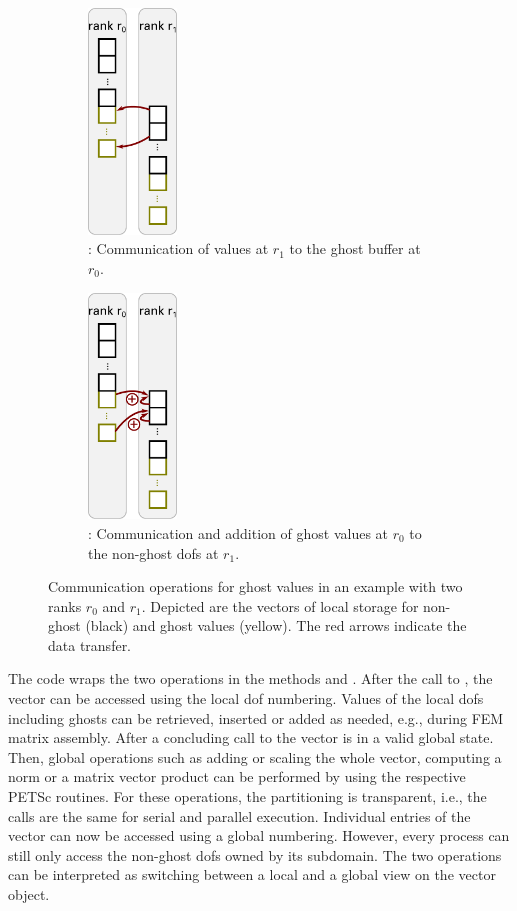 \begin{figure}%
  \centering%
  \begin{subfigure}[t]{0.45\textwidth}%
    \centering%
    \includegraphics[height=6cm]{images/implementation/1d_comm1.pdf}
    \caption{: Communication of values at $r_1$ to the ghost buffer at $r_0$.}%
    \label{fig:1d_comm1}%
  \end{subfigure}
  \quad
  \begin{subfigure}[t]{0.45\textwidth}%
    \centering%
    \includegraphics[height=6cm]{images/implementation/1d_comm2.pdf}
    \caption{: Communication and addition of ghost values at $r_0$ to the non-ghost dofs at $r_1$.}%
    \label{fig:1d_comm2}%
  \end{subfigure}
  \caption{Communication operations for ghost values in an example with two ranks $r_0$ and $r_1$. Depicted are the vectors of local storage for non-ghost (black) and ghost values (yellow). The red arrows indicate the data transfer.}%
  \label{fig:1d_comm}%
\end{figure}%
The \opendihu{} code wraps the two operations in the methods  and . After the call to , the vector can be accessed using the local dof numbering. Values of the local dofs including ghosts can be retrieved, inserted or added as needed, e.g., during FEM matrix assembly. 
After a concluding call to  the vector is in a valid global state. Then, global operations such as adding or scaling the whole vector, computing a norm or a matrix vector product can be performed by using the respective PETSc routines. For these operations, the partitioning is transparent, i.e., the calls are the same for serial and parallel execution. Individual entries of the vector can now be accessed using a global numbering. However, every process can still only access the non-ghost dofs owned by its subdomain. The two operations can be interpreted as switching between a local and a global view on the vector object.

